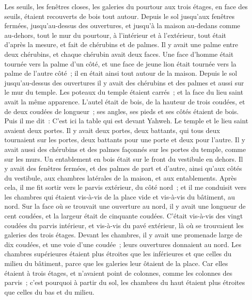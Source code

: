 \begin{multicols}{2}
Les seuils, les fenêtres closes, les galeries du pourtour aux trois étages, en face des seuils, étaient recouverts de bois tout autour. Depuis le sol jusqu'aux fenêtres fermées,
jusqu'au-dessus des ouvertures, et jusqu'à la maison au-dedans comme au-dehors, tout le mur du pourtour, à l'intérieur et à l'extérieur, tout était d'après la mesure,
et fait de chérubins et de palmes. Il y avait une palme entre deux chérubins, et chaque chérubin avait deux faces.
Une face d'homme était tournée vers la palme d'un côté, et une face de jeune lion était tournée vers la palme de l'autre côté~; il en était ainsi tout autour de la maison.
Depuis le sol jusqu'au-dessus des ouvertures il y avait des chérubins et des palmes et aussi sur le mur du temple.
Les poteaux du temple étaient carrés~; et la face du lieu saint avait la même apparence.
L'autel était de bois, de la hauteur de trois coudées, et de deux coudées de longueur~; ses angles, ses pieds et ses côtés étaient de bois. Puis il me dit~: C'est ici la table qui est devant Yahweh.
Le temple et le lieu saint avaient deux portes.
Il y avait deux portes, deux battants, qui tous deux tournaient sur les portes, deux battants pour une porte et deux pour l'autre.
Il y avait aussi des chérubins et des palmes façonnés sur les portes du temple, comme sur les murs. Un entablement en bois était sur le front du vestibule en dehors.
Il y avait des fenêtres fermées, et des palmes de part et d'autre, ainsi qu'aux côtés du vestibule, aux chambres latérales de la maison, et aux entablements.
\VerseOne{}Après cela, il me fit sortir vers le parvis extérieur, du côté nord~; et il me conduisit vers les chambres qui étaient vis-à-vis de la place vide et vis-à-vis du bâtiment, au nord.
Sur la face où se trouvait une ouverture au nord, il y avait une longueur de cent coudées, et la largeur était de cinquante coudées.
C'était vis-à-vis des vingt coudées du parvis intérieur, et vis-à-vis du pavé extérieur, là où se trouvaient les galeries des trois étages.
Devant les chambres, il y avait une promenade large de dix coudées, et une voie d'une coudée~; leurs ouvertures donnaient au nord.
Les chambres supérieures étaient plus étroites que les inférieures et que celles du milieu du bâtiment, parce que les galeries leur ôtaient de la place.
Car elles étaient à trois étages, et n'avaient point de colonnes, comme les colonnes des parvis~; c'est pourquoi à partir du sol, les chambres du haut étaient plus étroites que celles du bas et du milieu.

\end{multicols}
